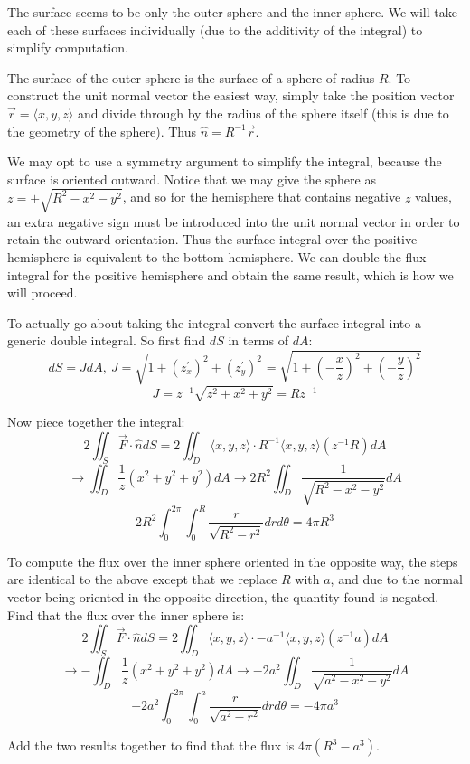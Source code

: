 \documentclass{article}
\begin{document}
The surface seems to be only the outer sphere and the inner sphere. We will take each of these surfaces individually (due to the additivity of the integral) to simplify computation.

The surface of the outer sphere is the surface of a sphere of radius $R$. To construct the unit normal vector the easiest way, simply take the position vector $\vec{r} = \langle x, y, z\rangle$ and divide through by the radius of the sphere itself (this is due to the geometry of the sphere). Thus $\hat{n} = R^{-1}\vec{r}$.

We may opt to use a symmetry argument to simplify the integral, because the surface is oriented outward. Notice that we may give the sphere as $z=\pm \sqrt{R^2-x^2-y^2}$, and so for the hemisphere that contains negative $z$ values, an extra negative sign must be introduced into the unit normal vector in order to retain the outward orientation. Thus the surface integral over the positive hemisphere is equivalent to the bottom hemisphere. We can double the flux integral for the positive hemisphere and obtain the same result, which is how we will proceed.

To actually go about taking the integral convert the surface integral into a generic double integral. So first find $dS$ in terms of $dA$:
$$dS = JdA,~ J = \sqrt{1+ \left(z^{\prime}_x\right)^2+\left(z^{\prime}_y\right)^2} = \sqrt{1+\left(-\frac{x}{z}\right)^2+\left(-\frac{y}{z}\right)^2}$$
$$J = z^{-1}\sqrt{z^2+x^2+y^2} = Rz^{-1}$$

Now piece together the integral:
$$2\iint_S \vec{F}\cdot \hat{n}dS = 2\iint_D \langle x, y ,z \rangle\cdot R^{-1}\langle x,y,z\rangle (z^{-1}R)dA $$
$$\to \iint_D \frac{1}{z}(x^2+y^2+y^2)dA \to 2R^2\iint_D \frac{1}{\sqrt{R^2-x^2-y^2}}dA$$
$$2R^2\int_0^{2\pi}\int_0^R \frac{r}{\sqrt{R^2-r^2}}drd\theta = 4\pi R^3$$

To compute the flux over the inner sphere oriented in the opposite way, the steps are identical to the above except that we replace $R$ with $a$, and due to the normal vector being oriented in the opposite direction, the quantity found is negated. Find that the flux over the inner sphere is:
$$2\iint_S \vec{F}\cdot \hat{n}dS = 2\iint_D \langle x, y ,z \rangle\cdot -a^{-1}\langle x,y,z\rangle (z^{-1}a)dA $$
$$\to -\iint_D \frac{1}{z}(x^2+y^2+y^2)dA \to -2a^2\iint_D \frac{1}{\sqrt{a^2-x^2-y^2}}dA$$
$$-2a^2\int_0^{2\pi}\int_0^a \frac{r}{\sqrt{a^2-r^2}}drd\theta = -4\pi a^3$$

Add the two results together to find that the flux is $4\pi(R^3-a^3)$.
\end{document}
